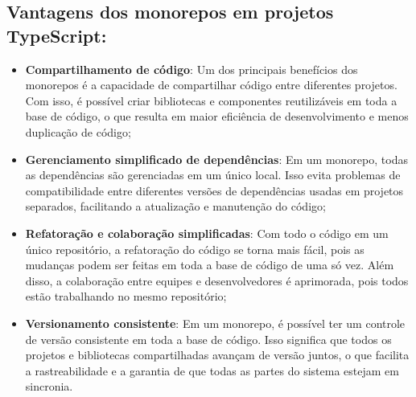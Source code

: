 \subsection*{Vantagens dos monorepos em projetos TypeScript:}
\begin{itemize}
    \item \textbf{Compartilhamento de código}: Um dos principais benefícios dos monorepos é a capacidade de compartilhar código entre diferentes projetos. Com isso, é possível criar bibliotecas e componentes reutilizáveis em toda a base de código, o que resulta em maior eficiência de desenvolvimento e menos duplicação de código;

    \item \textbf{Gerenciamento simplificado de dependências}: Em um monorepo, todas as dependências são gerenciadas em um único local. Isso evita problemas de compatibilidade entre diferentes versões de dependências usadas em projetos separados, facilitando a atualização e manutenção do código;

    \item \textbf{Refatoração e colaboração simplificadas}: Com todo o código em um único repositório, a refatoração do código se torna mais fácil, pois as mudanças podem ser feitas em toda a base de código de uma só vez. Além disso, a colaboração entre equipes e desenvolvedores é aprimorada, pois todos estão trabalhando no mesmo repositório;

    \item \textbf{Versionamento consistente}: Em um monorepo, é possível ter um controle de versão consistente em toda a base de código. Isso significa que todos os projetos e bibliotecas compartilhadas avançam de versão juntos, o que facilita a rastreabilidade e a garantia de que todas as partes do sistema estejam em sincronia.
\end{itemize}

